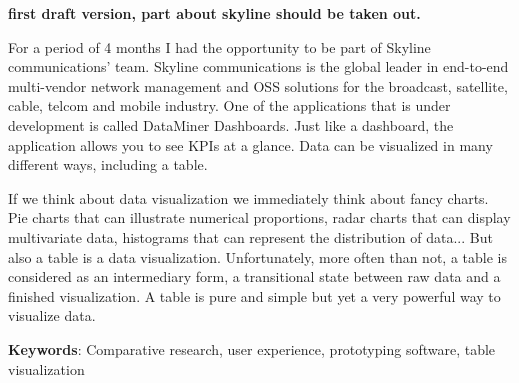 \textbf{first draft version, part about skyline should be taken out.}

For a period of 4 months I had the opportunity to be part of Skyline communications' team. Skyline communications is the global leader in end-to-end multi-vendor network management and OSS solutions for the broadcast, satellite, cable, telcom and mobile industry. One of the applications that is under development is called DataMiner Dashboards. Just like a dashboard, the application allows you to see KPIs at a glance. Data can be visualized in many different ways, including a table.

If we think about data visualization we immediately think about fancy charts. Pie charts that can illustrate numerical proportions, radar charts that can display multivariate data, histograms that can represent the distribution of data... But also a table is a data visualization. Unfortunately, more often than not, a table is considered as an intermediary form, a transitional state between raw data and a finished visualization. A table is pure and simple but yet a very powerful way to visualize data.  


\textbf{Keywords}:  Comparative research, user experience, prototyping software, table visualization

